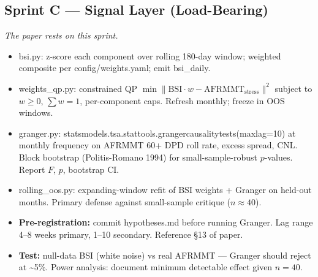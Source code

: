 \documentclass[11pt]{article}
\newcommand{\inlinecode}[1]{{\ttfamily\small #1}}
\begin{document}
\subsection{Sprint C --- Signal Layer (Load-Bearing)}
\textit{The paper rests on this sprint.}
\begin{itemize}
  \item \inlinecode{bsi.py}: z-score each component over rolling 180-day window; weighted composite per \inlinecode{config/weights.yaml}; emit \inlinecode{bsi\_daily}.
  \item \inlinecode{weights\_qp.py}: constrained QP $\min \| \mathrm{BSI} \cdot w - \mathrm{AFRMMT}_{\mathrm{stress}} \|^2$ subject to $w \ge 0$, $\sum w = 1$, per-component caps. Refresh monthly; freeze in OOS windows.
  \item \inlinecode{granger.py}: \inlinecode{statsmodels.tsa.stattools.grangercausalitytests(maxlag=10)} at monthly frequency on AFRMMT 60+ DPD roll rate, excess spread, CNL. Block bootstrap (Politis-Romano 1994) for small-sample-robust $p$-values. Report $F$, $p$, bootstrap CI.
  \item \inlinecode{rolling\_oos.py}: expanding-window refit of BSI weights + Granger on held-out months. Primary defense against small-sample critique ($n \approx 40$).
  \item \textbf{Pre-registration:} commit \inlinecode{hypotheses.md} before running Granger. Lag range 4--8 weeks primary, 1--10 secondary. Reference \S13 of paper.
  \item \textbf{Test:} null-data BSI (white noise) vs real AFRMMT --- Granger should reject at \textasciitilde5\%. Power analysis: document minimum detectable effect given $n = 40$.
\end{itemize}
\end{document}
